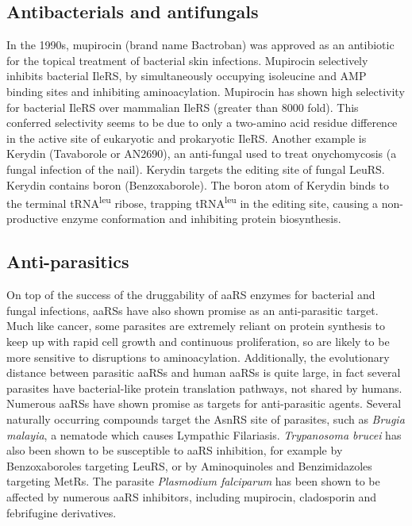 \subsection{Antibacterials and antifungals}
In the 1990s, mupirocin (brand name Bactroban) was approved as an antibiotic for the topical treatment of bacterial skin infections.
Mupirocin selectively inhibits bacterial IleRS, by simultaneously occupying isoleucine and AMP binding sites and inhibiting aminoacylation\cite{hurdle2005prospects}.
Mupirocin has shown high selectivity for bacterial IleRS over mammalian IleRS (greater than 8000 fold)\cite{hughes1980interaction}.
This conferred selectivity seems to be due to only a two-amino acid residue difference in the active site of eukaryotic and prokaryotic IleRS\cite{nakama2001structural}.
Another example is Kerydin (Tavaborole or AN2690), an anti-fungal used to treat onychomycosis (a fungal infection of the nail)\cite{fernandes2019boron}.
Kerydin targets the editing site of fungal LeuRS\@.
Kerydin contains boron (Benzoxaborole)\cite{fernandes2019boron}.
The boron atom of Kerydin binds to the terminal tRNA\textsuperscript{leu} ribose, trapping tRNA\textsuperscript{leu} in the editing site, causing a non-productive enzyme conformation and inhibiting protein biosynthesis.

\subsection{Anti-parasitics}
On top of the success of the druggability of aaRS enzymes for bacterial and fungal infections, aaRSs have also shown promise as an anti-parasitic target.
Much like cancer, some parasites are extremely reliant on protein synthesis to keep up with rapid cell growth and continuous proliferation, so are likely to be more sensitive to disruptions to aminoacylation.
Additionally, the evolutionary distance between parasitic aaRSs and human aaRSs is quite large, in fact several parasites have bacterial-like protein translation pathways, not shared by humans\cite{pham2014aminoacyl}.
Numerous aaRSs have shown promise as targets for anti-parasitic agents.
Several naturally occurring compounds target the AsnRS site of parasites, such as \textit{Brugia malayia}, a nematode which causes Lympathic Filariasis.
\textit{Trypanosoma brucei} has also been shown to be susceptible to aaRS inhibition, for example by Benzoxaboroles targeting LeuRS, or by Aminoquinoles and
Benzimidazoles targeting MetRs.
The parasite \textit{Plasmodium falciparum} has been shown to be affected by numerous aaRS inhibitors, including mupirocin, cladosporin and febrifugine derivatives.

